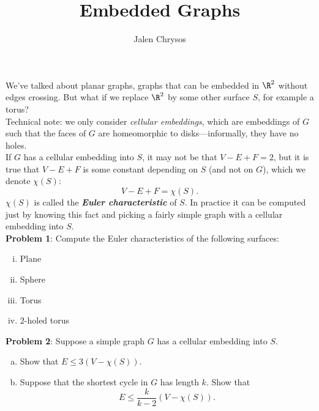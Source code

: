 \documentclass{amsart}
\author{Jalen Chrysos}
\title{Embedded Graphs}
\begin{document}
	\maketitle 
	We've talked about planar graphs, graphs that can be embedded in $\R^2$ without edges crossing. But what if we replace $\R^2$ by some other surface $S$, for example a torus?\\
%	
	
	\noindent Technical note: we only consider \textit{cellular embeddings}, which are embeddings of $G$ such that the faces of $G$ are homeomorphic to disks---informally, they have no holes.\\
%	
	
	\noindent 
	If $G$ has a cellular embedding into $S$, it may not be that $V-E+F=2$, but it is true that $V-E+F$ is some constant depending on $S$ (and not on $G$), which we denote $\chi(S)$:
	$$
	V - E + F = \chi(S).
	$$
	$\chi(S)$ is called the \textbf{\textit{Euler characteristic}} of $S$. In practice it can be computed just by knowing this fact and picking a fairly simple graph with a cellular embedding into $S$.\\
	
	\noindent \textbf{Problem 1}: Compute the Euler characteristics of the following surfaces:
	\begin{enumerate}[(i)]
		\item Plane
		\item Sphere
		\item Torus
		\item $2$-holed torus\\
	\end{enumerate}
	
	\noindent \textbf{Problem 2}: Suppose a simple graph $G$ has a cellular embedding into $S$.
	\begin{enumerate}[(a)]
		\item Show that $E\leq 3(V-\chi(S))$.
		\item Suppose that the shortest cycle in $G$ has length $k$. Show that 
		$$
		E \leq \frac{k}{k-2} (V-\chi(S)).
		$$
	\end{enumerate}
	\vspace{0.1cm}
	
\end{document}
